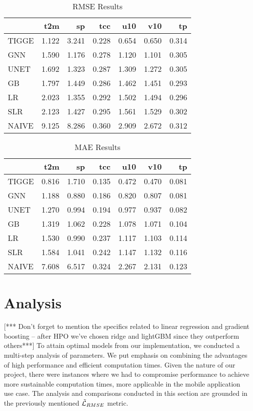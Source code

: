 \begin{table}
\centering
\caption{RMSE Results}
\label{tab:rmse}
\begin{tabular}{lrrrrrr}
\toprule
 & t2m & sp & tcc & u10 & v10 & tp \\
\midrule
TIGGE & 1.122 & 3.241 & 0.228 & 0.654 & 0.650 & 0.314 \\
GNN & 1.590 & 1.176 & 0.278 & 1.120 & 1.101 & 0.305 \\
UNET & 1.692 & 1.323 & 0.287 & 1.309 & 1.272 & 0.305 \\
GB & 1.797 & 1.449 & 0.286 & 1.462 & 1.451 & 0.293 \\
LR & 2.023 & 1.355 & 0.292 & 1.502 & 1.494 & 0.296 \\
SLR & 2.123 & 1.427 & 0.295 & 1.561 & 1.529 & 0.302 \\
NAIVE & 9.125 & 8.286 & 0.360 & 2.909 & 2.672 & 0.312 \\
\bottomrule
\end{tabular}
\end{table}

\begin{table}
\centering
\caption{MAE Results}
\label{tab:mae}
\begin{tabular}{lrrrrrr}
\toprule
 & t2m & sp & tcc & u10 & v10 & tp \\
\midrule
TIGGE & 0.816 & 1.710 & 0.135 & 0.472 & 0.470 & 0.081 \\
GNN & 1.188 & 0.880 & 0.186 & 0.820 & 0.807 & 0.081 \\
UNET & 1.270 & 0.994 & 0.194 & 0.977 & 0.937 & 0.082 \\
GB & 1.319 & 1.062 & 0.228 & 1.078 & 1.071 & 0.104 \\
LR & 1.530 & 0.990 & 0.237 & 1.117 & 1.103 & 0.114 \\
SLR & 1.584 & 1.041 & 0.242 & 1.147 & 1.132 & 0.116 \\
NAIVE & 7.608 & 6.517 & 0.324 & 2.267 & 2.131 & 0.123 \\
\bottomrule
\end{tabular}
\end{table}



\section{Analysis}\label{chap:analysis}
[*** Don't forget to mention the specifics related to linear regression and gradient boosting -- after HPO we've chosen ridge and lightGBM since they outperform others***]
To attain optimal models from our implementation, we conducted a multi-step analysis of parameters. We put emphasis on combining the advantages of high performance and efficient computation times. Given the nature of our project, there were instances where we had to compromise performance to achieve more sustainable computation times, more applicable in the mobile application use case. The analysis and comparisons conducted in this section are grounded in the previously mentioned $\Tilde{\mathcal{L}}_{RMSE}$ metric.

